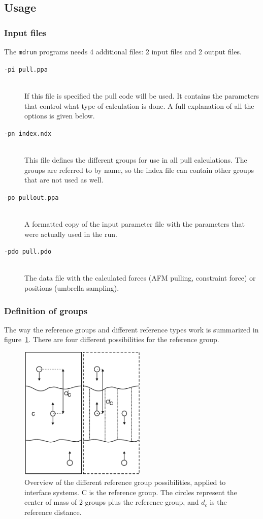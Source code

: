 \subsection{Usage}

\subsubsection{Input files}

The {\tt mdrun} programs needs 4 additional files: 2 input files and 2
output files. 
\begin{description}
\item[\tt -pi pull.ppa]\mbox{}\\ If this file is specified the pull code will
be used. It contains the parameters that control what type of
calculation is done. A full explanation of all the options is given below.
\item[\tt -pn index.ndx]\mbox{}\\ This file defines the different groups for
use in all pull calculations. The groups are referred to by name, so
the index file can contain other groups that are not used as well. 
\item[\tt -po pullout.ppa]\mbox{}\\ A formatted copy of the input parameter
file with the parameters that were actually used in the run.
\item[\tt -pdo pull.pdo]\mbox{}\\ The data file with the calculated forces
(AFM pulling, constraint force) or positions (umbrella sampling).
\end{description}

\subsubsection{Definition of groups}

The way the reference groups and different reference types work is
summarized in figure~\ref{fi:pullref}. There are four different
possibilities for the reference group. 

\begin{figure}
\centerline{\includegraphics[width=6cm]{plots/pullref}}
\caption{Overview of the different reference group possibilities,
applied to interface systems. C is the reference group. The circles
represent the center of mass of 2 groups plus the reference group, and
$d_c$ is the reference distance.}
\label{fi:pullref} 
\end{figure}   

